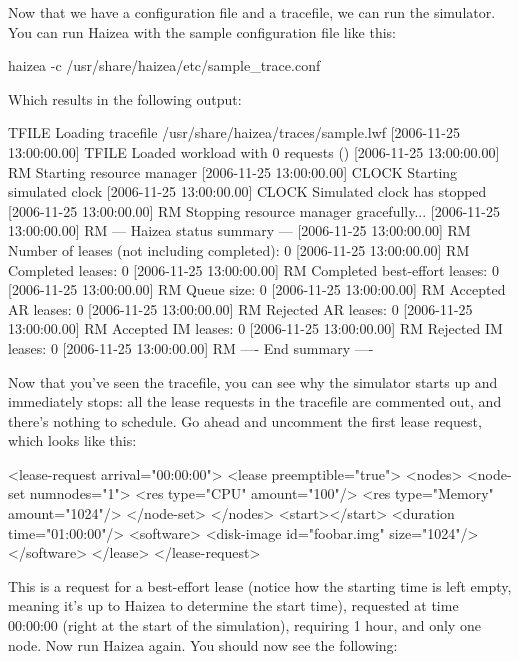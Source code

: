 Now that we have a configuration file and a tracefile, we can run the simulator. You can run Haizea with the sample configuration file like this:

\begin{shellverbatim}
haizea -c /usr/share/haizea/etc/sample_trace.conf 
\end{shellverbatim}

Which results in the following output:

\begin{wideshellverbatim}
[2006-11-25 13:00:00.00] TFILE   Loading tracefile /usr/share/haizea/traces/sample.lwf
[2006-11-25 13:00:00.00] TFILE   Loaded workload with 0 requests ()
[2006-11-25 13:00:00.00] RM      Starting resource manager
[2006-11-25 13:00:00.00] CLOCK   Starting simulated clock
[2006-11-25 13:00:00.00] CLOCK   Simulated clock has stopped
[2006-11-25 13:00:00.00] RM      Stopping resource manager gracefully...
[2006-11-25 13:00:00.00] RM      --- Haizea status summary ---
[2006-11-25 13:00:00.00] RM      Number of leases (not including completed): 0
[2006-11-25 13:00:00.00] RM      Completed leases: 0
[2006-11-25 13:00:00.00] RM      Completed best-effort leases: 0
[2006-11-25 13:00:00.00] RM      Queue size: 0
[2006-11-25 13:00:00.00] RM      Accepted AR leases: 0
[2006-11-25 13:00:00.00] RM      Rejected AR leases: 0
[2006-11-25 13:00:00.00] RM      Accepted IM leases: 0
[2006-11-25 13:00:00.00] RM      Rejected IM leases: 0
[2006-11-25 13:00:00.00] RM      ---- End summary ----
\end{wideshellverbatim}

Now that you've seen the tracefile, you can see why the simulator starts up and immediately stops: all the lease requests in the tracefile are commented out, and there's nothing to schedule. Go ahead and uncomment the first lease request, which looks like this:

\begin{wideshellverbatim}
<lease-request arrival="00:00:00">
<lease preemptible="true">
	<nodes>
		<node-set numnodes="1">
			<res type="CPU" amount="100"/>
			<res type="Memory" amount="1024"/>
		</node-set>
	</nodes>	
	<start></start>
	<duration time="01:00:00"/>
	<software>
		<disk-image id="foobar.img" size="1024"/>
	</software>
</lease>
</lease-request>
\end{wideshellverbatim}

This is a request for a best-effort lease (notice how the starting time is left empty, meaning it's up to Haizea to determine the start time), requested at time 00:00:00 (right at the start of the simulation), requiring 1 hour, and only one node. Now run Haizea again. You should now see the following:

